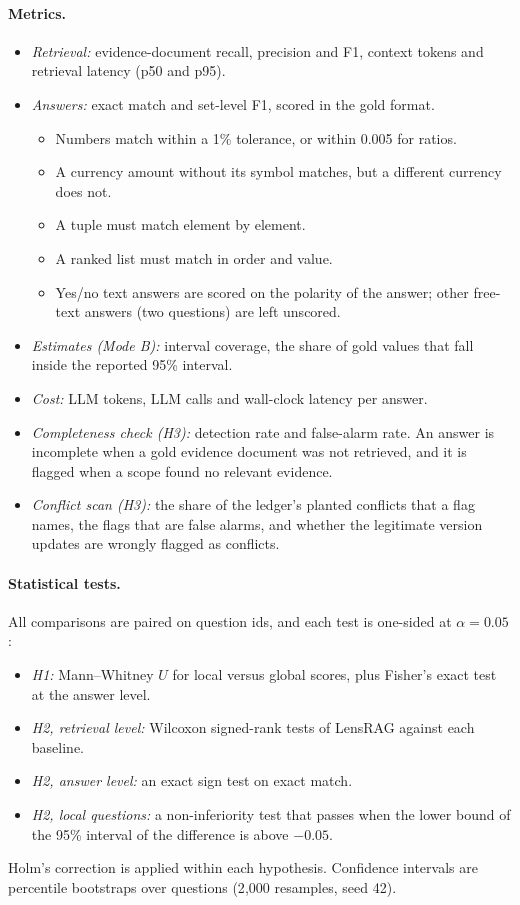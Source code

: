 \documentclass[11pt,letterpaper,oneside]{report}
\begin{document}
\paragraph{Metrics.}
\begin{itemize}
  \item \emph{Retrieval:} evidence-document recall, precision and F1, context
  tokens and retrieval latency (p50 and p95).
  \item \emph{Answers:} exact match and set-level F1, scored in the gold
  format.
  \begin{itemize}
    \item Numbers match within a 1\% tolerance, or within 0.005 for ratios.
    \item A currency amount without its symbol matches, but a different
    currency does not.
    \item A tuple must match element by element.
    \item A ranked list must match in order and value.
    \item Yes/no text answers are scored on the polarity of the answer;
    other free-text answers (two questions) are left unscored.
  \end{itemize}
  \item \emph{Estimates (Mode B):} interval coverage, the share of gold values
  that fall inside the reported 95\% interval.
  \item \emph{Cost:} LLM tokens, LLM calls and wall-clock latency per answer.
  \item \emph{Completeness check (H3):} detection rate and false-alarm rate.
  An answer is incomplete when a gold evidence document was not retrieved,
  and it is flagged when a scope found no relevant evidence.
  \item \emph{Conflict scan (H3):} the share of the ledger's planted
  conflicts that a flag names, the flags that are false alarms, and whether
  the legitimate version updates are wrongly flagged as conflicts.
\end{itemize}

\paragraph{Statistical tests.}
All comparisons are paired on question ids, and each test is one-sided at
$\alpha=0.05$:
\begin{itemize}
  \item \emph{H1:} Mann--Whitney $U$ for local versus global scores, plus
  Fisher's exact test at the answer level.
  \item \emph{H2, retrieval level:} Wilcoxon signed-rank tests of LensRAG
  against each baseline.
  \item \emph{H2, answer level:} an exact sign test on exact match.
  \item \emph{H2, local questions:} a non-inferiority test that passes when
  the lower bound of the 95\% interval of the difference is above $-0.05$.
\end{itemize}
Holm's correction is applied within each hypothesis. Confidence intervals are
percentile bootstraps over questions (2{,}000 resamples, seed 42).
\end{document}
